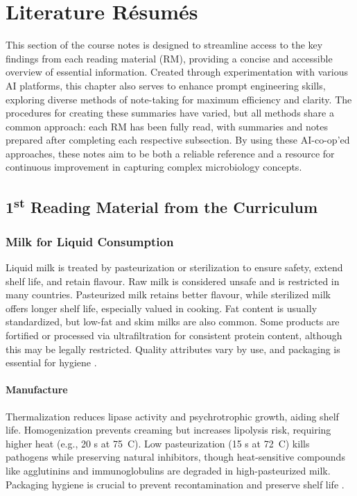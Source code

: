 \chapter{Literature Résumés}
\setlength{\headheight}{12.71342pt}
\addtolength{\topmargin}{-0.71342pt}

This section of the course notes is designed to streamline access to the key findings from each reading material (RM), providing a concise and accessible overview of essential information. Created through experimentation with various AI platforms, this chapter also serves to enhance prompt engineering skills, exploring diverse methods of note-taking for maximum efficiency and clarity. The procedures for creating these summaries have varied, but all methods share a common approach: each RM has been fully read, with summaries and notes prepared after completing each respective subsection. By using these AI-co-op'ed approaches, these notes aim to be both a reliable reference and a resource for continuous improvement in capturing complex microbiology concepts.

\section{1\texorpdfstring{\textsuperscript{st}}{st} Reading Material from the Curriculum}

\subsection{Milk for Liquid Consumption}
Liquid milk is treated by pasteurization or sterilization to ensure safety, extend shelf life, and retain flavour. Raw milk is considered unsafe and is restricted in many countries. Pasteurized milk retains better flavour, while sterilized milk offers longer shelf life, especially valued in cooking. Fat content is usually standardized, but low-fat and skim milks are also common. Some products are fortified or processed via ultrafiltration for consistent protein content, although this may be legally restricted. Quality attributes vary by use, and packaging is essential for hygiene \cite*{curr_rm_01_dairy_science_technology}.

\subsubsection*{Manufacture}
Thermalization reduces lipase activity and psychrotrophic growth, aiding shelf life. Homogenization prevents creaming but increases lipolysis risk, requiring higher heat (e.g., 20 s at 75~\textdegree C). Low pasteurization (15 s at 72~\textdegree C) kills pathogens while preserving natural inhibitors, though heat-sensitive compounds like agglutinins and immunoglobulins are degraded in high-pasteurized milk. Packaging hygiene is crucial to prevent recontamination and preserve shelf life \cite*{curr_rm_01_dairy_science_technology}.


